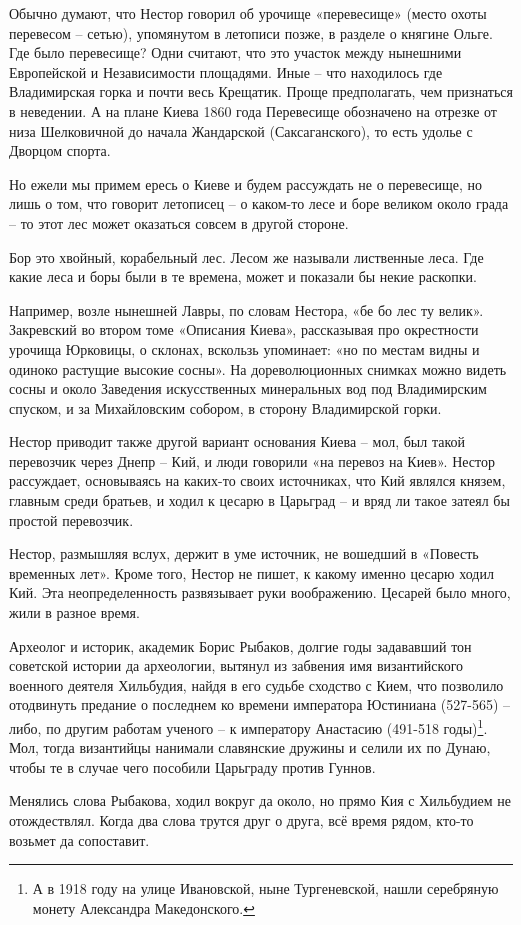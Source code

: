 Обычно думают, что Нестор говорил об урочище «перевесище» (место охоты перевесом – сетью), упомянутом в летописи позже, в разделе о княгине Ольге. Где было перевесище? Одни считают, что это участок между нынешними Европейской и Независимости площадями. Иные – что находилось где Владимирская горка и почти весь Крещатик. Проще предполагать, чем признаться в неведении. А на плане Киева 1860 года Перевесище обозначено на отрезке от низа Шелковичной до начала Жандарской (Саксаганского), то есть удолье с Дворцом спорта.




Но ежели мы примем ересь о Киеве и будем рассуждать не о перевесище, но лишь о том, что говорит летописец – о каком-то лесе и боре великом около града – то этот лес может оказаться совсем в другой стороне.

Бор это хвойный, корабельный лес. Лесом же называли лиственные леса. Где какие леса и боры были в те времена, может и показали бы некие раскопки. 

Например, возле нынешней Лавры, по словам Нестора, «бе бо лес ту велик». Закревский во втором томе «Описания Киева»\cite{zakr01}, рассказывая про окрестности урочища Юрковицы, о склонах, вскользь упоминает: «но по местам видны и одиноко растущие высокие сосны». На дореволюционных снимках можно видеть сосны и около Заведения искусственных минеральных вод под Владимирским спуском, и за Михайловским собором, в сторону Владимирской горки.

Нестор приводит также другой вариант основания Киева – мол, был такой перевозчик через Днепр – Кий, и люди говорили  «на перевоз на Киев». Нестор рассуждает, основываясь на каких-то своих источниках, что Кий являлся князем, главным среди братьев, и ходил к цесарю в Царьград – и вряд ли такое затеял бы простой перевозчик. 

Нестор, размышляя вслух, держит в уме источник, не вошедший в «Повесть временных лет». Кроме того, Нестор не пишет, к какому именно цесарю ходил Кий. Эта неопределенность развязывает руки воображению. Цесарей было много, жили в разное время.

Археолог и историк, академик Борис Рыбаков, долгие годы задававший тон советской истории да археологии, вытянул из забвения имя византийского военного деятеля Хильбудия, найдя в его судьбе сходство с Кием, что позволило отодвинуть предание о последнем ко времени императора Юстиниана (527-565) – либо, по другим работам ученого – к императору Анастасию (491-518 годы)\footnote{А в 1918 году на улице Ивановской, ныне Тургеневской, нашли серебряную монету Александра Македонского.}. Мол, тогда византийцы нанимали славянские дружины и селили их по Дунаю, чтобы те в случае чего пособили Царьграду против Гуннов.

Менялись слова Рыбакова, ходил вокруг да около, но прямо Кия с Хильбудием не отождествлял. Когда два слова трутся друг о друга, всё время рядом, кто-то возьмет да сопоставит.
